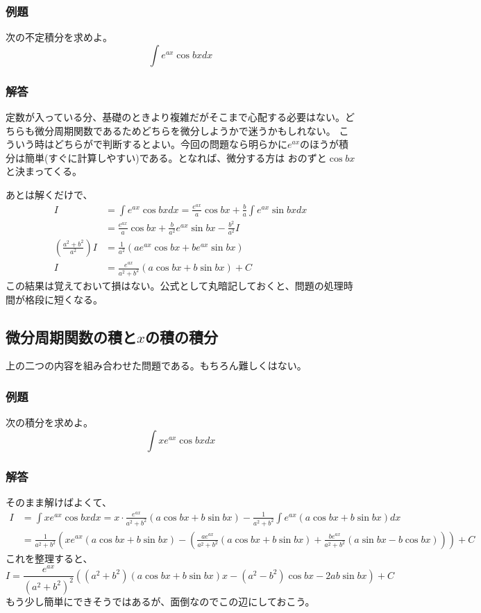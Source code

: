 \documentclass[a4j,dvipdfmx]{jsarticle}
\begin{document}
\subsubsection*{例題}
次の不定積分を求めよ。
\begin{equation*}
    \int e^{ax}\cos bxdx
\end{equation*}
\subsubsection*{解答}
定数が入っている分、基礎のときより複雑だがそこまで心配する必要はない。どちらも微分周期関数であるためどちらを微分しようかで迷うかもしれない。
こういう時はどちらがで判断するとよい。今回の問題なら明らかに$e^{ax}$のほうが積分は簡単(すぐに計算しやすい)である。となれば、微分する方は
おのずと$\cos bx$と決まってくる。

あとは解くだけで、
\begin{align*}
    I&=\int e^{ax}\cos bxdx=\frac{e^{ax}}{a}\cos bx+\frac{b}{a}\int e^{ax}\sin bx dx\\
    &=\frac{e^{ax}}{a}\cos bx+\frac{b}{a^2}e^{ax}\sin bx-\frac{b^2}{a^2}I\\
    (\frac{a^2+b^2}{a^2})I&=\frac{1}{a^2}(ae^{ax}\cos bx+be^{ax}\sin bx)\\
    I&=\frac{e^{ax}}{a^2+b^2}(a\cos bx+b\sin bx)+C
\end{align*}
この結果は覚えておいて損はない。公式として丸暗記しておくと、問題の処理時間が格段に短くなる。

\subsection{微分周期関数の積と$x$の積の積分}
上の二つの内容を組み合わせた問題である。もちろん難しくはない。
\subsubsection*{例題}
次の積分を求めよ。
\begin{equation*}
    \int xe^{ax}\cos bx dx
\end{equation*}
\subsubsection*{解答}
そのまま解けばよくて、
\begin{align*}
    I&=\int xe^{ax}\cos bx dx=x\cdot\frac{e^{ax}}{a^2+b^2}(a\cos bx+b\sin bx)-\frac{1}{a^2+b^2}\int e^{ax}(a\cos bx+b\sin bx)dx\\
    &=\frac{1}{a^2+b^2}(xe^{ax}(a\cos bx+b\sin bx)-\left(\frac{ae^{ax}}{a^2+b^2}(a\cos bx+b\sin bx)+\frac{be^{ax}}{a^2+b^2}(a\sin bx-b\cos bx)\right))+C
\end{align*}
これを整理すると、
\newpage
\begin{equation*}
    I=\frac{e^{ax}}{(a^2+b^2)^2}\left((a^2+b^2)(a\cos bx+b\sin bx)x-(a^2-b^2)\cos bx-2ab\sin bx\right)+C
\end{equation*}
もう少し簡単にできそうではあるが、面倒なのでこの辺にしておこう。
\end{document}
